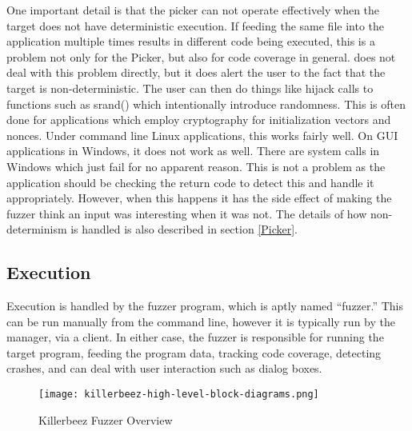 \begin{multicols}{2}
One important detail is that the picker can not operate effectively when the
target does not have deterministic execution.  If feeding the same file into
the application multiple times results in different code being executed, this
is a problem not only for the Picker, but also for code coverage in general.
\AFL{} does not deal with this problem directly, but it does alert the user to
the fact that the target is non-deterministic. The user can then do things like
hijack calls to functions such as srand() which intentionally introduce
randomness. This is often done for applications which employ cryptography for
initialization vectors and nonces. Under command line Linux applications, this
works fairly well.  On GUI applications in Windows, it does not work as well.
There are system calls in Windows which just fail for no apparent reason. This
is not a problem as the application should be checking the return code to
detect this and handle it appropriately.  However, when this happens it has the
side effect of making the fuzzer think an input was interesting when it was
not.  The details of how non-determinism is handled is also described in
section \ref{Picker}.

\subsection{Execution}
Execution is handled by the fuzzer program, which is aptly named ``fuzzer.''
This can be run manually from the command line, however it is typically run by
the manager, via a \BOINC{} client.  In either case, the fuzzer is responsible
for running the target program, feeding the program data, tracking code
coverage, detecting crashes, and can deal with user interaction such as dialog
boxes.

\end{multicols}
\begin{figure}[hp]
\centering
\texttt{[image: killerbeez-high-level-block-diagrams.png]}
\caption{Killerbeez Fuzzer Overview}
\label{fig:Killerbeez-fuzzer-overview}
\end{figure}
